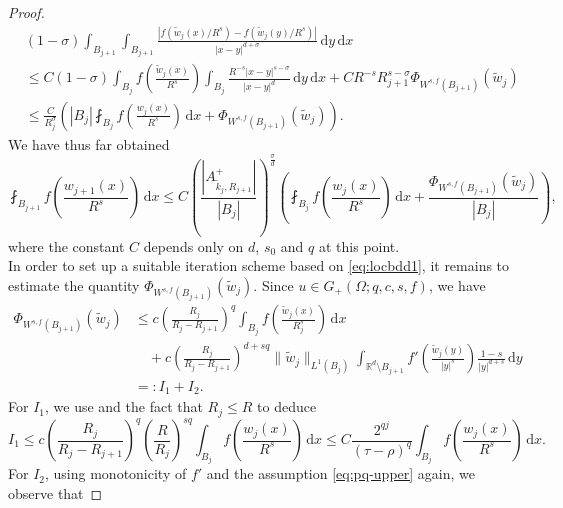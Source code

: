 \documentclass[11pt]{amsart}
\theoremstyle{plain}
\theoremstyle{definition}
\numberwithin{equation}{section}
\newcommand{\dx} {\,\mathrm{d}x}
\newcommand{\dy} {\,\mathrm{d}y}
\newcommand{\Rd}{\mathbb{R}^d}
\begin{document}
\begin{proof}
\begin{equation*}
\begin{split}
&(1-\sigma) \int_{B_{j+1}} \int_{B_{j+1}} \frac{|f(\tilde{w}_j(x)/R^s) - f(\tilde{w}_j(y)/R^s)|}{|x-y|^{d+\sigma}} \dy \dx \\
&\leq C(1-\sigma) \int_{B_{j}} f\left( \frac{\tilde{w}_j(x)}{R^s}\right) \int_{B_{j}} \frac{R^{-s} |x-y|^{s-\sigma}}{|x-y|^{d}} \dy \dx + C R^{-s} R_{j+1}^{s-\sigma} \Phi_{W^{s, f}(B_{j+1})}(\tilde{w}_j) \\
&\leq \frac{C}{R_j^{\sigma}} \left( |B_j| \fint_{B_j} f\left( \frac{w_j(x)}{R^s} \right) \dx + \Phi_{W^{s, f}(B_{j+1})}(\tilde{w}_j) \right).
\end{split}
\end{equation*}
We have thus far obtained
\begin{equation} \label{eq:locbdd1}
\fint_{B_{j+1}} f\left( \frac{w_{j+1}(x)}{R^s} \right) \dx \leq C \left( \frac{|A_{\tilde{k}_j, R_{j+1}}^+|}{|B_j|} \right)^{\frac{\sigma}{d}} \left( \fint_{B_j} f\left( \frac{w_j(x)}{R^s} \right) \dx + \frac{\Phi_{W^{s, f}(B_{j+1})}(\tilde{w}_j)}{|B_j|}  \right),
\end{equation}
where the constant $C$ depends only on $d$, $s_0$ and $q$ at this point.\\
In order to set up a suitable iteration scheme based on \eqref{eq:locbdd1}, it remains to estimate the quantity $\Phi_{W^{s, f}(B_{j+1})}(\tilde{w}_j)$. Since $u \in G_+(\Omega; q, c, s, f)$, we have
\begin{equation} \label{eq:locbdd-I12}
\begin{split}
\Phi_{W^{s, f}(B_{j+1})}(\tilde{w}_j)
&\leq c \left( \frac{R_j}{R_j-R_{j+1}} \right)^{q} \int_{B_j} f\left( \frac{\tilde{w}_j(x)}{R_j^s} \right) \dx \\
&\quad + c \left( \frac{R_j}{R_j-R_{j+1}} \right)^{d+sq} \|\tilde{w}_j \|_{L^1(B_{j})} \int_{\Rd \setminus B_{j+1}} f' \left( \frac{\tilde{w}_j(y)}{|y|^s} \right) \frac{1-s}{|y|^{d+s}} \dy \\
&=: I_1 + I_2.
\end{split}
\end{equation}
For $I_1$, we use  and the fact that $R_j \leq R$ to deduce
\begin{equation} \label{eq:locbdd-I1}
I_1 \leq c \left( \frac{R_j}{R_j-R_{j+1}} \right)^{q} \left( \frac{R}{R_j} \right)^{sq} \int_{B_j} f\left( \frac{w_j(x)}{R^s} \right) \dx \leq C \frac{2^{qj}}{(\tau-\rho)^{q}} \int_{B_j} f\left( \frac{w_j(x)}{R^s} \right) \dx.
\end{equation}
For $I_2$, using monotonicity of $f'$ and the assumption \eqref{eq:pq-upper} again, we observe that

\end{proof}
\end{document}
